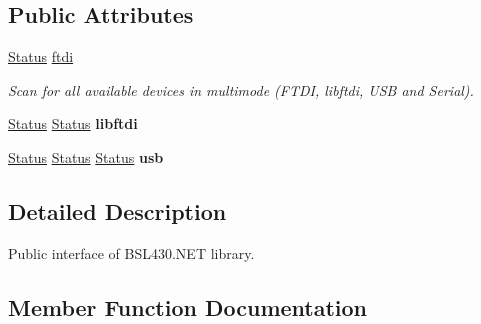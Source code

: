 \subsection*{Public Attributes}
\begin{DoxyCompactItemize}
\item 
\mbox{\hyperlink{class_b_s_l430___n_e_t_1_1_status}{Status}} \mbox{\hyperlink{interface_b_s_l430___n_e_t_1_1_i_bsl430_net_a2edaa235290e3b3b5551db0a60bc0781}{ftdi}}
\begin{DoxyCompactList}\small\item\em Scan for all available devices in multimode (F\+T\+DI, libftdi, U\+SB and Serial). \end{DoxyCompactList}\item 
\mbox{\label{interface_b_s_l430___n_e_t_1_1_i_bsl430_net_a3c0d0859f1353071808e688bbb8b5e58}} 
\mbox{\hyperlink{class_b_s_l430___n_e_t_1_1_status}{Status}} \mbox{\hyperlink{class_b_s_l430___n_e_t_1_1_status}{Status}} {\bfseries libftdi}
\item 
\mbox{\label{interface_b_s_l430___n_e_t_1_1_i_bsl430_net_a6e713a4c541b3f822d8eef19e9d2c75c}} 
\mbox{\hyperlink{class_b_s_l430___n_e_t_1_1_status}{Status}} \mbox{\hyperlink{class_b_s_l430___n_e_t_1_1_status}{Status}} \mbox{\hyperlink{class_b_s_l430___n_e_t_1_1_status}{Status}} {\bfseries usb}
\end{DoxyCompactItemize}


\subsection{Detailed Description}
Public interface of B\+S\+L430.\+N\+ET library. 



\subsection{Member Function Documentation}
\mbox{\label{interface_b_s_l430___n_e_t_1_1_i_bsl430_net_abd3e49c1f00bfa2f42d58094e2ae3526}} 
